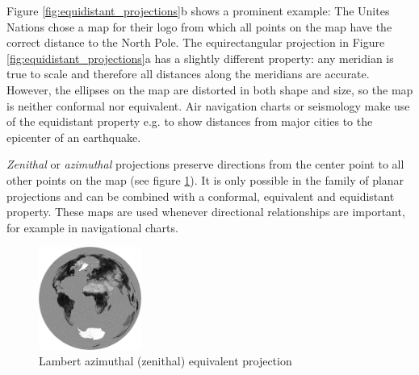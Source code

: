\addtocounter{footnote}{1} %


Figure \ref{fig:equidistant_projections}b shows a prominent example: The Unites Nations chose a map for their logo from which all points on the map have the correct distance to the North Pole. The equirectangular projection in Figure \ref{fig:equidistant_projections}a has a slightly different property: any meridian is true to scale and therefore all distances along the meridians are accurate. However, the ellipses on the map are distorted in both shape and size, so the map is neither conformal nor equivalent. Air navigation charts or seismology make use of the equidistant property e.g. to show distances from major cities to the epicenter of an earthquake.
\cite{mapProjectionGeokov}

\emph{Zenithal} or \emph{azimuthal} projections preserve directions from the center point to all other points on the map (see figure \ref{fig:zenithal_projection}). It is only possible in the family of planar projections and can be combined with a conformal, equivalent and equidistant property. These maps are used whenever directional relationships are important, for example in navigational charts.

\begin{figure}[ht]
  \centering
  \includegraphics[width=0.3\textwidth]{graphics/basics/projection_distortion_azimuthal.png}
  \caption{Lambert azimuthal (zenithal) equivalent projection \protect\footnotemark}
  \label{fig:zenithal_projection}
\end{figure}


